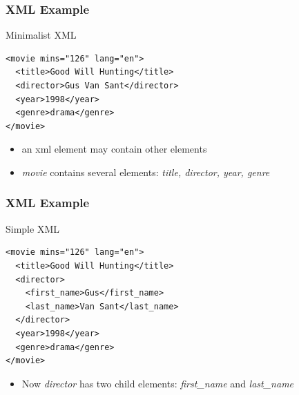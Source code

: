 \documentclass{beamer}\usepackage[]{graphicx}\usepackage[]{color}
\begin{document}
\begin{frame}[fragile]
\frametitle{XML Example}

\begin{block}{Minimalist XML}
\begin{verbatim}
<movie mins="126" lang="en">
  <title>Good Will Hunting</title>
  <director>Gus Van Sant</director>
  <year>1998</year>
  <genre>drama</genre>
</movie>
\end{verbatim}
\end{block}

\bigskip

\begin{itemize}
 \item an xml element may contain other elements
 \item \textit{movie} contains several elements: \textit{title, director, year, genre}
\end{itemize}

\end{frame}


\begin{frame}[fragile]
\frametitle{XML Example}

\begin{block}{Simple XML}
\begin{verbatim}
<movie mins="126" lang="en">
  <title>Good Will Hunting</title>
  <director>
    <first_name>Gus</first_name>
    <last_name>Van Sant</last_name>
  </director>
  <year>1998</year>
  <genre>drama</genre>
</movie>
\end{verbatim}
\end{block}

\bigskip

\begin{itemize}
 \item Now \textit{director} has two child elements: \textit{first\_name} and \textit{last\_name}
\end{itemize}

\end{frame}

\end{document}
